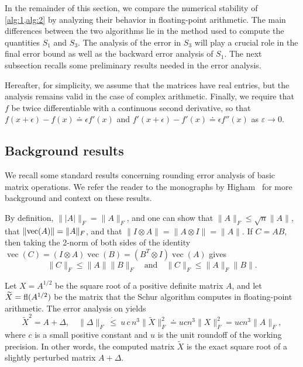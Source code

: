 \documentclass[DIV=14]{scrartcl}
\newcommand\ledot{~\dot{\le}~}
\theoremstyle{thmstyletwo}
\theoremstyle{definition}
\numberwithin{equation}{section}
\DeclareMathOperator{\opvec}{vec}
\newcommand{\wt}{\widetilde}
\renewcommand{\Delta}{\varDelta}
\begin{document}
In the remainder of this section, we compare the numerical stability of \cref{alg:1,alg:2} by analyzing their behavior in floating-point arithmetic. The main differences between the two algorithms lie in the method used to compute the quantities $S_1$ and $S_3$. The analysis of the error in $S_3$ will play a crucial role in the final error bound as well as the backward error analysis of $S_1$. The next subsection recalls some preliminary results needed in the error analysis.

Hereafter, for simplicity, we assume that the matrices have real entries, but the analysis remains valid in the case of complex arithmetic.
Finally, we require that $f$ be twice differentiable with a continuous second derivative, so that $f(x+\epsilon)-f(x)\doteq \epsilon f'(x)$ and $f'(x+\epsilon)-f'(x)\doteq \epsilon f''(x)$ as $\varepsilon\rightarrow 0$.

\subsection{Background results}

We recall some standard results concerning rounding error analysis of basic matrix operations. We refer the reader to the monographs by Higham~\cite{higham:book02, higham:book08} for more background and context on these results.

By definition, $\| |A|\|_F=\|A\|_F$, and one can show that $\|A\|_F\le \sqrt n\|A\|$, that $\|\hbox{vec}(A)\|=\|A\|_F$, and that $\|I\otimes A\|=\|A\otimes I\|=\|A\|$.
If $C=AB$, then taking the 2-norm of both sides of the identity $\opvec(C)=(I\otimes A)\opvec(B)=(B^T\otimes I)\opvec(A)$ gives
\begin{equation}\label{eq:F2}
\|C\|_F\le\|A\|\|B\|_F \quad\text{and}\quad \|C\|_F\le\|A\|_F\|B\|.
\end{equation}

Let $X=A^{1/2}$ be the square root
of a positive definite matrix $A$,
and let $\wt X=\hbox{fl}(A^{1/2})$ be the matrix that the Schur algorithm computes in floating-point arithmetic. The error analysis on \cite[p.~139]{higham:book08} yields
\begin{equation}\label{eq:ersqrt}
    \wt X^2=A+\Delta,\quad \|\Delta\|_F\ledot u\, c\, n^3 \|\wt X\|_F^2\doteq ucn^3\|X\|_F^2=ucn^3\|A\|_F,
\end{equation}
where $c$ is a small positive constant and $u$ is the unit roundoff of the working precision. In other words, the computed matrix $\wt X$ is the exact square root of a slightly perturbed matrix $A+\Delta$.
\end{document}
